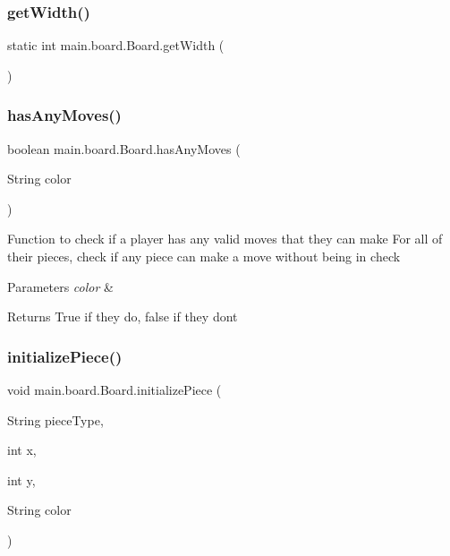 \subsubsection{\texorpdfstring{get\+Width()}{getWidth()}}
{\footnotesize\ttfamily static int main.\+board.\+Board.\+get\+Width (\begin{DoxyParamCaption}{ }\end{DoxyParamCaption})\hspace{0.3cm}{\ttfamily [static]}}

\hypertarget{classmain_1_1board_1_1_board_aa39f27be6d9f5a96d9f0166823e2c91b}{}\label{classmain_1_1board_1_1_board_aa39f27be6d9f5a96d9f0166823e2c91b} 
\subsubsection{\texorpdfstring{has\+Any\+Moves()}{hasAnyMoves()}}
{\footnotesize\ttfamily boolean main.\+board.\+Board.\+has\+Any\+Moves (\begin{DoxyParamCaption}\item[{String}]{color }\end{DoxyParamCaption})}

Function to check if a player has any valid moves that they can make For all of their pieces, check if any piece can make a move without being in check 
\begin{DoxyParams}{Parameters}
{\em color} & \\
\hline
\end{DoxyParams}
\begin{DoxyReturn}{Returns}
True if they do, false if they don\textquotesingle{}t 
\end{DoxyReturn}
\hypertarget{classmain_1_1board_1_1_board_a5c19feac8766d7d05bc5a99af9636d9e}{}\label{classmain_1_1board_1_1_board_a5c19feac8766d7d05bc5a99af9636d9e} 
\subsubsection{\texorpdfstring{initialize\+Piece()}{initializePiece()}}
{\footnotesize\ttfamily void main.\+board.\+Board.\+initialize\+Piece (\begin{DoxyParamCaption}\item[{String}]{piece\+Type,  }\item[{int}]{x,  }\item[{int}]{y,  }\item[{String}]{color }\end{DoxyParamCaption})}

